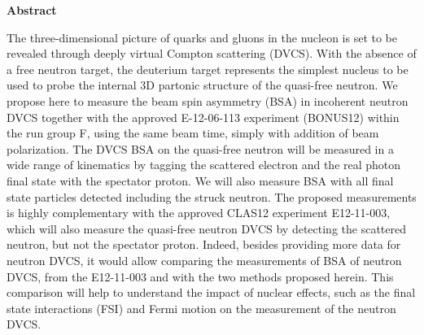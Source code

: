 \setcounter{page}{5}

     \begin{center}
{\large\textbf{Abstract}}
    \end{center}
\vspace*{0.4cm}

The three-dimensional picture of quarks and gluons in the nucleon is set to be 
revealed through deeply virtual Compton scattering (DVCS). With the absence of 
a free neutron target, the deuterium target represents the simplest nucleus to 
be used to probe the internal 3D partonic structure of the quasi-free neutron.  
We propose here to measure the beam spin asymmetry (BSA) in incoherent neutron DVCS 
together with the approved E-12-06-113 experiment (BONUS12) within the run group F, 
using the same beam time, simply with addition of beam polarization. The DVCS BSA on the
quasi-free neutron will be measured in a wide range of kinematics by tagging 
the scattered electron and the real photon final state with the spectator 
proton. We will also measure BSA with all final state particles detected
including the struck 
neutron. The proposed measurements is highly complementary with the approved CLAS12 
experiment E12-11-003, which will also measure the quasi-free neutron DVCS by 
detecting the scattered neutron, but not the spectator proton. 
Indeed, besides providing more data for neutron DVCS, it would allow comparing 
the measurements of BSA of neutron DVCS, from the E12-11-003 and with
the two methods proposed herein. This comparison will help to understand the impact of 
nuclear effects, such as the final state interactions (FSI) and Fermi motion 
on the measurement of the neutron DVCS.

\newpage

